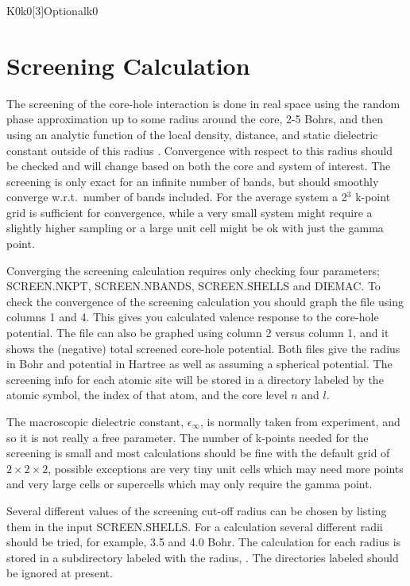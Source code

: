 \documentclass[11pt]{report}
\begin{document}
\begin{Card}{K0}{k0[3]}{Optional}{k0}
\chapter{Screening Calculation}
\label{screening}

The screening of the core-hole interaction is done in real space using the random phase approximation up to 
some radius around the core, 2-5 Bohrs, and then using an analytic function of the local density, distance, 
and static dielectric constant outside of this radius \cite{Shirley2006986}. Convergence with respect to this radius should be 
checked and will change based on both the core and system of interest. The screening is only exact for an 
infinite number of bands, but should smoothly converge w.r.t.\ number of bands included. For the average 
system a 2$^3$ k-point grid is sufficient for convergence, while a very small system might require a 
slightly higher sampling or a large unit cell might be ok with just the gamma point.

Converging the screening calculation requires only checking four parameters; SCREEN.NKPT, SCREEN.NBANDS, SCREEN.SHELLS and DIEMAC. To check the convergence of the screening calculation you should graph the file  using columns 1 and 4. This gives you calculated valence response to the core-hole potential. The file  can also be graphed using column 2 versus column 1, and it shows the (negative) total screened core-hole potential. Both files give the radius in Bohr and potential in Hartree as well as assuming a spherical potential. The screening info for each atomic site will be stored in a directory labeled by the atomic symbol, the index of that atom, and the core level $n$ and $l$.

The macroscopic dielectric constant, $\epsilon_\infty$, is normally taken from experiment, and so it is not really a free parameter. The number of k-points needed for the screening is small and most calculations should be fine with the default grid of $2\times2\times2$, possible exceptions are very tiny unit cells which may need more points and very large cells or supercells which may only require the gamma point. 

Several different values of the screening cut-off radius can be chosen by listing them in the input SCREEN.SHELLS. For a calculation several different radii should be tried, for example, 3.5 and 4.0 Bohr. The calculation for each radius is stored in a subdirectory labeled with the radius, . The directories labeled  should be ignored at present. 


\end{Card}
\end{document}
